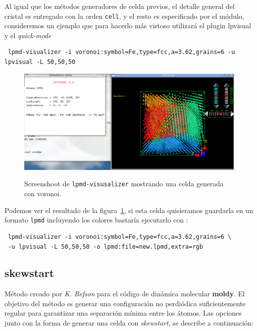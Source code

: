 
Al igual que los m\'etodos generadores de celda previos, el detalle general del cristal es entregado con la orden \verb|cell|, y el resto es especificado por el m\'odulo, consideremos un ejemplo que para hacerlo m\'as vistoso utilizar\'a el plugin lpvisual y el \textit{quick-mode}

\begin{verbatim}
 lpmd-visualizer -i voronoi:symbol=Fe,type=fcc,a=3.62,grains=6 -u lpvisual -L 50,50,50
\end{verbatim}

\begin{figure}[h!]
 \centering
 \includegraphics[scale=.35]{voronoi-1.png}
 \label{fig:voronoi-1}
 \caption{Screenshoot de \texttt{lpmd-visusalizer} mostrando una celda generada con voronoi.}
\end{figure}

Podemos ver el resultado de la figura~\ref{fig:voronoi-1}, si esta celda quisieramos guardarla en un formato \verb|lpmd| incluyendo los colores bastar\'ia ejecutarlo con :

 \begin{verbatim}
 lpmd-visualizer -i voronoi:symbol=Fe,type=fcc,a=3.62,grains=6 \
 -u lpvisual -L 50,50,50 -o lpmd:file=new.lpmd,extra=rgb
\end{verbatim}



\subsection{skewstart}
M\'etodo creado por \textit{K. Refson} para el c\'odigo de din\'amica molecular \textbf{moldy}. El objetivo del m\'etodo es generar una configuraci\'on no perdi\'odica suficientemente regular para garantizar una separaci\'on m\'inima entre los \'atomos. Las opciones junto con la forma de generar una celda con \textit{skewstart}, se describe a continuaci\'on:

